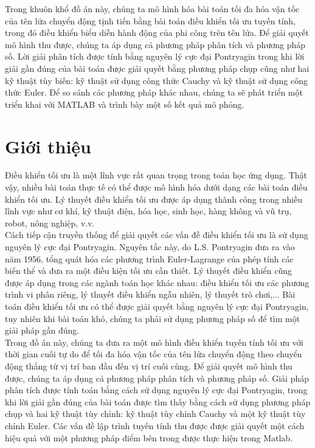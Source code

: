 \documentclass[12pt,a4paper]{report}
\begin{document}
	Trong khuôn khổ đồ án này, chúng ta mô hình hóa bài toán tối đa hóa vận tốc của tên lửa chuyển động tịnh tiến bằng bài toán điều khiển tối ưu tuyến tính, trong đó điều khiển biểu diễn hành động của phi công trên tên lửa. Để giải quyết mô hình thu được, chúng ta áp dụng cả phương pháp phân tích và phương pháp số. Lời giải phân tích được tính bằng nguyên lý cực đại Pontryagin trong khi lời giải gần đúng của bài toán được giải quyết bằng phương pháp chụp cũng như hai kỹ thuật tùy biến: kỹ thuật sử dụng công thức Cauchy và kỹ thuật sử dụng công thức Euler. Để so sánh các phương pháp khác nhau, chúng ta sẽ phát triển một triển khai với MATLAB và trình bày một số kết quả mô phỏng.
	
	\section{Giới thiệu}
	Điều khiển tối ưu là một lĩnh vực rất quan trọng trong toán học ứng dụng. Thật vậy, nhiều bài toán thực tế có thể được mô hình hóa dưới dạng các bài toán điều khiển tối ưu. Lý thuyết điều khiển tối ưu được áp dụng thành công trong nhiều lĩnh vực như cơ khí, kỹ thuật điện, hóa học, sinh học, hàng không và vũ trụ, robot, nông nghiệp, v.v.\\Cách tiếp cận truyền thống để giải quyết các vấn đề điều khiển tối ưu là sử dụng nguyên lý cực đại Pontryagin. Nguyên tắc này, do L.S. Pontryagin đưa ra vào năm 1956, tổng quát hóa các phương trình Euler-Lagrange của phép tính các biến thể và đưa ra một điều kiện tối ưu cần thiết. Lý thuyết điều khiển cũng được áp dụng trong các ngành toán học khác nhau: điều khiển tối ưu các phương trình vi phân riêng, lý thuyết điều khiển ngẫu nhiên, lý thuyết trò chơi,... Bài toán điều khiển tối ưu có thể được giải quyết bằng nguyên lý cực đại Pontryagin, tuy nhiên khi bài toán khó, chúng ta phải sử dụng phương pháp số để tìm một giải pháp gần đúng.
	\\Trong đồ án này, chúng ta đưa ra một mô hình điều khiển tuyến tính tối ưu với thời gian cuối tự do để tối đa hóa vận tốc của tên lửa chuyển động theo chuyển động thẳng từ vị trí ban đầu đến vị trí cuối cùng. Để giải quyết mô hình thu được, chúng ta áp dụng cả phương pháp phân tích và phương pháp số. Giải pháp phân tích được tính toán bằng cách sử dụng nguyên lý cực đại Pontryagin, trong khi lời giải gần đúng của bài toán được tìm thấy bằng cách sử dụng phương pháp chụp và hai kỹ thuật tùy chỉnh: kỹ thuật tùy chỉnh Cauchy và một kỹ thuật tùy chỉnh Euler. Các vấn đề lập trình tuyến tính thu được được giải quyết một cách hiệu quả với một phương pháp điểm bên trong được thực hiện trong Matlab.
\end{document}
